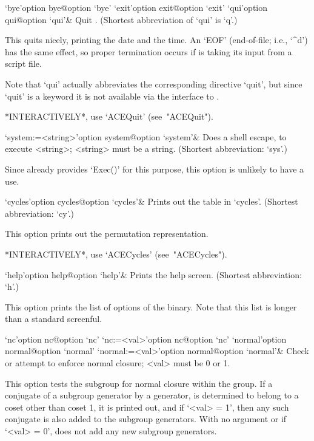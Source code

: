 
\beginitems

\>`bye'{option bye}@{option `bye'}
\>`exit'{option exit}@{option `exit'}
\>`qui'{option qui}@{option `qui'}&
Quit {\ACE}. (Shortest abbreviation of `qui' is `q'.)

This quits {\ACE} nicely, printing the date and  the  time.  An  `EOF'
(end-of-file;  i.e.,  `\^{}d')  has  the  same   effect,   so   proper
termination occurs if {\ACE} is taking its input from a script file.

Note  that  `qui'  actually  abbreviates  the   corresponding   {\ACE}
directive `quit', but since `quit' is  a  {\GAP}  keyword  it  is  not
available via the {\GAP} interface to {\ACE}.

*INTERACTIVELY*, use `ACEQuit' (see~"ACEQuit").

\>`system:=<string>'{option system}@{option `system'}&
Does a shell escape, to execute <string>; <string> must be a string.
(Shortest abbreviation: `sys'.)

Since {\GAP} already provides `Exec()' for this purpose,  this  option
is unlikely to have a use.

\enditems


\beginitems

\>`cycles'{option cycles}@{option `cycles'}&
Prints out the table in `cycles'. (Shortest abbreviation: `cy'.)

This option prints out the permutation representation.

*INTERACTIVELY*, use `ACECycles' (see~"ACECycles").

\>`help'{option help}@{option `help'}&
Prints the {\ACE} help screen. (Shortest abbreviation: `h'.)

This option prints the list of options of the {\ACE} binary. Note that
this list is longer than a standard screenful.

\>`nc'{option nc}@{option `nc'}
\>`nc:=<val>'{option nc}@{option `nc'}
\>`normal'{option normal}@{option `normal'}
\>`normal:=<val>'{option normal}@{option `normal'}&
Check or attempt to enforce normal closure; <val> must be 0 or 1.

This option tests the subgroup for normal closure within the group. If
a conjugate of a subgroup generator by a generator, is  determined  to
belong to a coset other than coset 1, it is printed out, and if `<val>
=  1',  then  any  such  conjugate  is  also  added  to  the  subgroup
generators. With no argument or if `<val> = 0', {\ACE}  does  not  add
any new subgroup generators.

